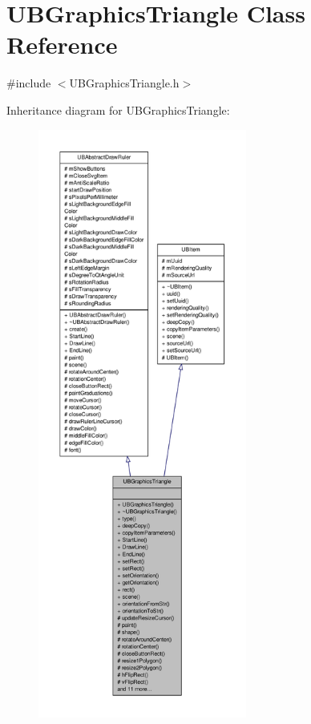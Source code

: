\hypertarget{class_u_b_graphics_triangle}{\section{U\-B\-Graphics\-Triangle Class Reference}
\label{da/dd0/class_u_b_graphics_triangle}
}


{\ttfamily \#include $<$U\-B\-Graphics\-Triangle.\-h$>$}



Inheritance diagram for U\-B\-Graphics\-Triangle\-:
\nopagebreak
\begin{figure}[H]
\begin{center}
\leavevmode
\includegraphics[height=550pt]{d3/d44/class_u_b_graphics_triangle__inherit__graph}
\end{center}
\end{figure}


